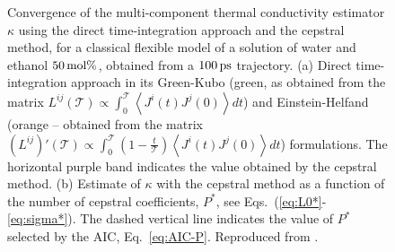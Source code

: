 \begin{figure}
    \begin{center}
    \end{center}
	\caption{Convergence of the multi-component thermal conductivity estimator $\kappa$ using the direct time-integration approach and the cepstral method, for a classical flexible model of a solution of water and ethanol $50\,\mathrm{mol}\%$, obtained from a $100\,\mathrm{ps}$ trajectory.
(a) Direct time-integration approach in its Green-Kubo (green, as obtained from the matrix $L^{ij}(\mathcal{T})\propto\int_0^\mathcal{T} \left\langle J^i(t) J^j(0) \right\rangle dt $) and Einstein-Helfand (orange -- obtained from the  matrix $\left (L^{ij}\right )'(\mathcal{T}) \propto  \int_0^\mathcal{T}\left(1-\frac{t}{\mathcal{T}}\right) \left \langle J^i(t) J^j(0) \right \rangle dt$) formulations. The horizontal purple band indicates the value obtained by the cepstral method.
(b) Estimate of $\kappa$ with the cepstral method as a function of the number of cepstral coefficients, $P^*$, see Eqs.~(\ref{eq:L0*}-\ref{eq:sigma*}). The dashed vertical line indicates the value of $P^*$ selected by the AIC, Eq.~\eqref{eq:AIC-P}. Reproduced from \cite{Bertossa2018}.
}  \label{fig:twoCompConvergence}
\end{figure}

